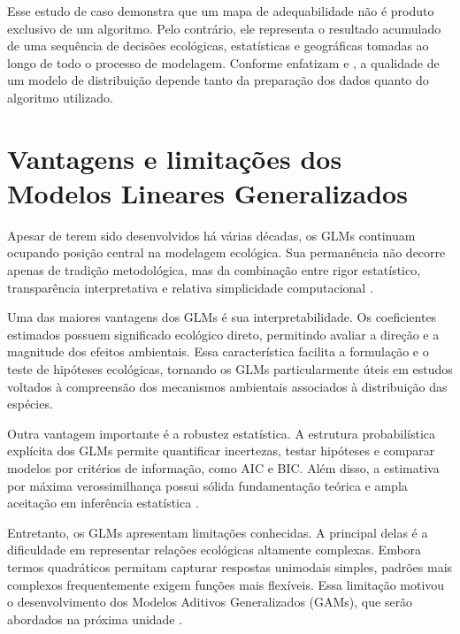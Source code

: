 Esse estudo de caso demonstra que um mapa de adequabilidade não é produto exclusivo de um algoritmo. Pelo contrário, ele representa o resultado acumulado de uma sequência de decisões ecológicas, estatísticas e geográficas tomadas ao longo de todo o processo de modelagem. Conforme enfatizam \citet{franklin2010mapping} e \citet{guisan2017habitat}, a qualidade de um modelo de distribuição depende tanto da preparação dos dados quanto do algoritmo utilizado.


\section{Vantagens e limitações dos Modelos Lineares Generalizados}

Apesar de terem sido desenvolvidos há várias décadas, os GLMs continuam ocupando posição central na modelagem ecológica. Sua permanência não decorre apenas de tradição metodológica, mas da combinação entre rigor estatístico, transparência interpretativa e relativa simplicidade computacional \citep{mccullagh1989generalized,guisan2002generalized}.

Uma das maiores vantagens dos GLMs é sua interpretabilidade. Os coeficientes estimados possuem significado ecológico direto, permitindo avaliar a direção e a magnitude dos efeitos ambientais. Essa característica facilita a formulação e o teste de hipóteses ecológicas, tornando os GLMs particularmente úteis em estudos voltados à compreensão dos mecanismos ambientais associados à distribuição das espécies.

Outra vantagem importante é a robustez estatística. A estrutura probabilística explícita dos GLMs permite quantificar incertezas, testar hipóteses e comparar modelos por critérios de informação, como AIC e BIC. Além disso, a estimativa por máxima verossimilhança possui sólida fundamentação teórica e ampla aceitação em inferência estatística \citep{burnham2002model}.

Entretanto, os GLMs apresentam limitações conhecidas. A principal delas é a dificuldade em representar relações ecológicas altamente complexas. Embora termos quadráticos permitam capturar respostas unimodais simples, padrões mais complexos frequentemente exigem funções mais flexíveis. Essa limitação motivou o desenvolvimento dos Modelos Aditivos Generalizados (GAMs), que serão abordados na próxima unidade \citep{hastie1990generalized,wood2017generalized}.

